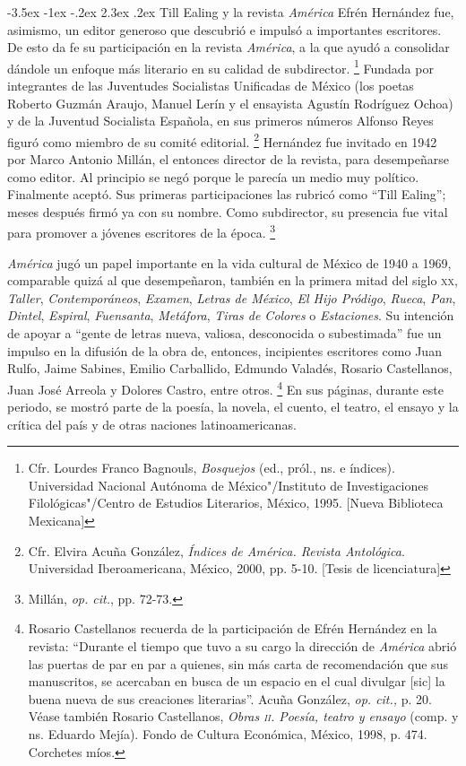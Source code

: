 \documentclass[14pt,twoside,final]{extbook} %
\makeatletter
\let\oldfootnote\footnote
\renewcommand\footnote[1]{%
\oldfootnote{\hspace{1mm}#1}}
\renewcommand\section{\@startsection {section}{1}{\z@}%
                                     {-3.5ex \@plus -1ex \@minus -.2ex}%
                                     {2.3ex \@plus .2ex}%
                                     {\normalfont\large\bfseries\sc}}
\makeatother
\begin{document}
\section{Till Ealing y la revista \emph{América}}\label{sec:till-ealing-y-la-revista-america}\protect\enlargethispage*{\baselineskip}
Efrén Hernández fue, asimismo, un editor generoso que descubrió e impulsó a importantes escritores. De esto da fe su participación en la revista \emph{América}, a la que ayudó a consolidar dándole un enfoque más literario en su calidad de subdirector.\footnote{Cfr. Lourdes Franco Bagnouls, \emph{Bosquejos} (ed., pról., ns. e índices). Universidad Nacional Autónoma de México"/Instituto de Investigaciones Filológicas"/Centro de Estudios Literarios, México, 1995. [Nueva Biblioteca Mexicana]} Fundada por integrantes de las Juventudes Socialistas Unificadas de México (los poetas Roberto Guzmán Araujo, Manuel Lerín y el ensayista Agustín Rodríguez Ochoa) y de la Juventud Socialista Española, en sus primeros números Alfonso Reyes figuró como miembro de su comité editorial.\footnote{Cfr. Elvira Acuña González, \emph{Índices de \emph{América. Revista Antológica}}. Universidad Iberoamericana, México, 2000, pp. 5-10. [Tesis de licenciatura]} Hernández fue invitado en 1942 por Marco Antonio Millán, el entonces director de la revista, para desempeñarse como editor. Al principio se negó porque le parecía un medio muy político. Finalmente aceptó. Sus primeras participaciones las rubricó como ``Till Ealing''; meses después firmó ya con su nombre. Como subdirector, su presencia fue vital para promover a jóvenes escritores de la época.\footnote{Millán, \emph{op. cit.}, pp. 72-73.}

\emph{América} jugó un papel importante en la vida cultural de México de 1940 a 1969, comparable quizá al que desempeñaron, también en la primera mitad del siglo \textsc{xx}, \emph{Taller}, \emph{Contemporáneos}, \emph{Examen}, \emph{Letras de México}, \emph{El Hijo Pródigo}, \emph{Rueca}, \emph{Pan}, \emph{Dintel}, \emph{Espiral}, \emph{Fuensanta}, \emph{Metáfora}, \emph{Tiras de Colores} o \emph{Estaciones}. Su intención de apoyar a ``gente de letras nueva, valiosa, desconocida o subestimada'' fue un impulso en la difusión de la obra de, entonces, incipientes escritores como Juan Rulfo, Jaime Sabines, Emilio Carballido, Edmundo Valadés, Rosario Castellanos, Juan José Arreola y Dolores Castro, entre otros.\footnote{Rosario Castellanos recuerda de la participación de Efrén Hernández en la revista: ``Durante el tiempo que tuvo a su cargo la dirección de \emph{América} abrió las puertas de par en par a quienes, sin más carta de recomendación que sus manuscritos, se acercaban en busca de un espacio en el cual divulgar [sic] la buena nueva de sus creaciones literarias''. Acuña González, \emph{op. cit.,} p. 20. Véase también Rosario Castellanos, \emph{Obras \textsc{ii}. Poesía, teatro y ensayo} (comp. y ns. Eduardo Mejía). Fondo de Cultura Económica, México, 1998, p. 474. Corchetes míos.} En sus páginas, durante este periodo, se mostró parte de la poesía, la novela, el cuento, el teatro, el ensayo y la crítica del país y de otras naciones latinoamericanas.\protect\enlargethispage*{\baselineskip}
\end{document}
